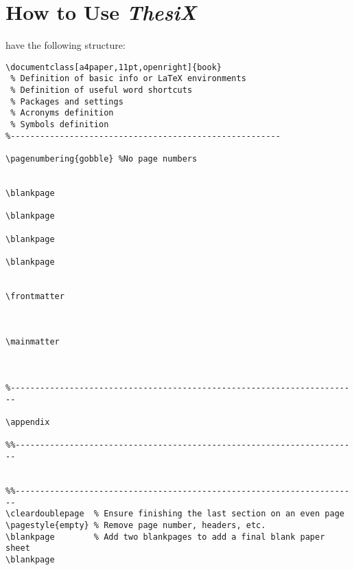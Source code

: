 \section{How to Use \textit{ThesiX}}
\ThesiX{} have the following structure:

\begin{lstlisting}
\documentclass[a4paper,11pt,openright]{book}
 % Definition of basic info or LaTeX environments
 % Definition of useful word shortcuts
 % Packages and settings
 % Acronyms definition
 % Symbols definition
%-------------------------------------------------------

\pagenumbering{gobble} %No page numbers


\blankpage

\blankpage

\blankpage

\blankpage


\frontmatter



\mainmatter



%-----------------------------------------------------------------------

\appendix

%%----------------------------------------------------------------------


%%----------------------------------------------------------------------
\cleardoublepage  % Ensure finishing the last section on an even page
\pagestyle{empty} % Remove page number, headers, etc.
\blankpage        % Add two blankpages to add a final blank paper sheet
\blankpage

\end{lstlisting}
